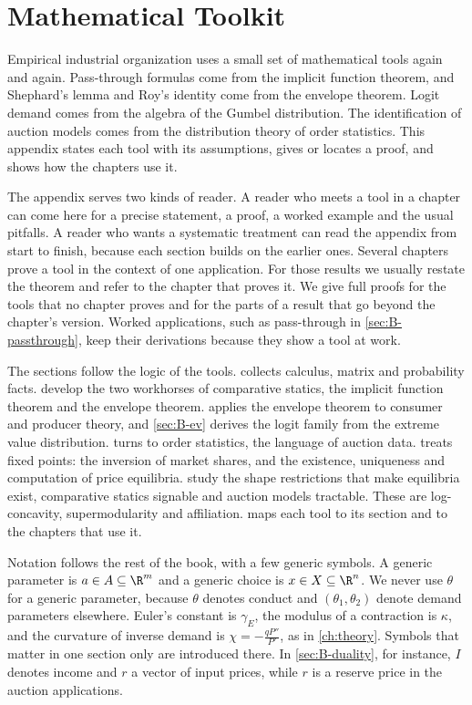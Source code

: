 \chapter{Mathematical Toolkit}\label{app:math}

Empirical industrial organization uses a small set of mathematical tools again and again. Pass-through formulas
come from the implicit function theorem, and Shephard's lemma and Roy's identity come from the envelope theorem.
Logit demand comes from the algebra of the Gumbel distribution. The identification of auction models comes from
the distribution theory of order statistics. This appendix states each tool with its assumptions, gives or locates
a proof, and shows how the chapters use it.

The appendix serves two kinds of reader. A reader who meets a tool in a chapter can come here for a precise
statement, a proof, a worked example and the usual pitfalls. A reader who wants a systematic treatment can read
the appendix from start to finish, because each section builds on the earlier ones. Several chapters prove a tool
in the context of one application. For those results we usually restate the theorem and refer to the chapter
that proves it. We give full proofs for the tools that no chapter proves and for the parts of a result that go
beyond the chapter's version. Worked applications, such as pass-through in \cref{sec:B-passthrough}, keep their
derivations because they show a tool at work.

The sections follow the logic of the tools.  collects calculus, matrix and probability facts.
 develop the two workhorses of comparative statics, the implicit function theorem
and the envelope theorem.  applies the envelope theorem to consumer and producer theory, and
\cref{sec:B-ev} derives the logit family from the extreme value distribution.  turns to
order statistics, the language of auction data.  treats fixed points: the inversion of
market shares, and the existence, uniqueness and computation of price equilibria.  study the shape restrictions that make equilibria exist, comparative statics signable and auction
models tractable. These are log-concavity, supermodularity and affiliation.  maps each tool
to its section and to the chapters that use it.

Notation follows the rest of the book, with a few generic symbols. A generic parameter is $a \in A \subseteq \R^m$
and a generic choice is $x \in X \subseteq \R^n$. We never use $\theta$ for a generic parameter, because $\theta$
denotes conduct and $(\theta_1, \theta_2)$ denote demand parameters elsewhere. Euler's constant is $\gamma_E$, the
modulus of a contraction is $\kappa$, and the curvature of inverse demand is $\chi = -\frac{qP''}{P'}$, as in
\cref{ch:theory}. Symbols that matter in one section only are introduced there. In \cref{sec:B-duality}, for
instance, $I$ denotes income and $r$ a vector of input prices, while $r$ is a reserve price in the auction
applications.

